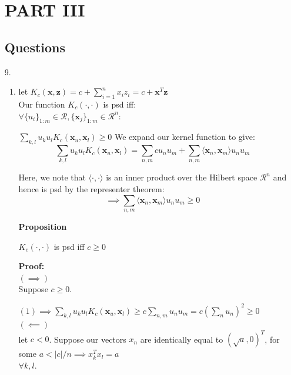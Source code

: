 \documentclass[12pt]{article}
\begin{document}
\begin{enumerate}[leftmargin=\labelsep]
\section{PART III}
\subsection{Questions}
\item[9.] \begin{enumerate}
              \item let $K_{c}(\textbf{x},\textbf{z}) = c+ \sum_{i=1}^{n}x_{i}z_{i} = c + \textbf{x}^{T}\textbf{z}$\\
        Our function $K_{c}(\cdot, \cdot)$ is psd iff:\\
        $\forall \{ u_{i} \}_{1:m} \in \mathcal{R},
         \{ \textbf{x}_{j}\}_{1:m} \in \mathcal{R}^{n}$:

        $\sum_{k,l} u_{k}u_{l}K_{c}(\textbf{x}_{u},\textbf{x}_{l}) \ge 0$
        We expand our kernel function to give: \\

        \[\sum_{k,l} u_{k}u_{l}K_{c}(\textbf{x}_{u},\textbf{x}_{l}) =  \sum_{n,m} cu_{n} u_{m} + \sum_{n,m} \langle\textbf{x}_{n}, \textbf{x}_{m}\rangle u_{n} u_{m}\]

        Here, we note that $\langle \cdot, \cdot \rangle$ is an inner product over the Hilbert space $\mathcal{R}^{n}$ and hence is psd by the representer theorem:
                \begin{equation}
        \implies \sum_{n,m} \langle\textbf{x}_{n},
        \textbf{x}_{m}\rangle u_{n} u_{m} \ge 0
                \end{equation}

        \textbf{Proposition}

        $K_{c}(\cdot, \cdot)$ is psd iff $c \ge0$

        \textbf{Proof:}\\
        $(\implies)$\\

        Suppose $c \ge 0$.

         $(1) \implies \sum_{k,l} u_{k}u_{l}K_{c}(\textbf{x}_{u},\textbf{x}_{l}) \ge c \sum_{n,m}u_{n}u_{m} = c (\sum_{n}u_{n})^{2} \ge 0$\\

        $(\impliedby)$\\

        let $c < 0$.
        Suppose our vectors $x_{n}$ are identically equal to $ (\sqrt{a},0)^{T}$, for some $a < |c|/n \implies x_{k}^{T}x_{l} = a $\\
        $\forall k,l$.\\


\end{enumerate}
\end{enumerate}
\end{document}
